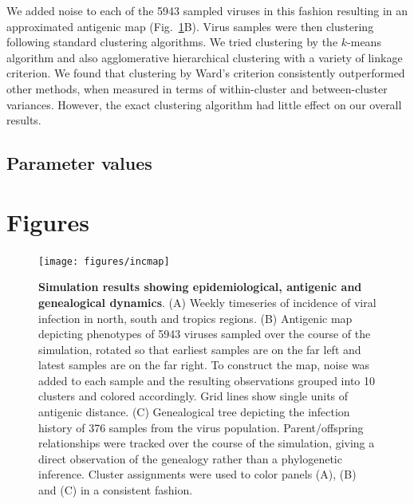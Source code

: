 \documentclass[11pt,oneside,letterpaper]{article}
\begin{document}
We added noise to each of the 5943 sampled viruses in this fashion resulting in an approximated antigenic map (Fig.~\ref{incmap}B).  Virus samples were then clustering following standard clustering algorithms.  We tried clustering by the $k$-means algorithm and also agglomerative hierarchical clustering with a variety of linkage criterion.  We found that clustering by Ward's criterion consistently outperformed other methods, when measured in terms of within-cluster and between-cluster variances.  However, the exact clustering algorithm had little effect on our overall results.

\subsection*{Parameter values}



\pagebreak

\section*{Figures}

\begin{figure}[H]
	\centering
	\texttt{[image: figures/incmap]}
	\caption{\textbf{Simulation results showing epidemiological, antigenic and genealogical dynamics}. (A) Weekly timeseries of incidence of viral infection in north, south and tropics regions. (B) Antigenic map depicting phenotypes of 5943 viruses sampled over the course of the simulation, rotated so that earliest samples are on the far left and latest samples are on the far right.  To construct the map, noise was added to each sample and the resulting observations grouped into 10 clusters and colored accordingly.  Grid lines show single units of antigenic distance. (C) Genealogical tree depicting the infection history of 376 samples from the virus population.  Parent/offspring relationships were tracked over the course of the simulation, giving a direct observation of the genealogy rather than a phylogenetic inference. Cluster assignments were used to color panels (A), (B) and (C) in a consistent fashion.}
	\label{incmap}
\end{figure}

\pagebreak
\end{document}
